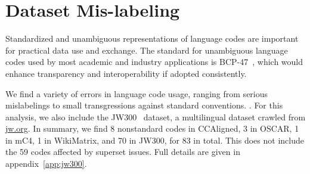 \section{Dataset Mis-labeling}
\label{sec:codes}


Standardized and unambiguous representations of language codes are important for practical data use and exchange. The standard for unambiguous language codes used by most academic and industry applications is BCP-47~\citep{phillips-etal-2005-tags}, which would  enhance transparency and interoperability if adopted consistently. %

We find a variety of errors in language code usage, ranging from serious mislabelings to small transgressions against standard conventions. . For this analysis, we also include the JW300~\citep{agic-vulic-2019-jw300} dataset, a multilingual dataset crawled from \url{jw.org}. %
In summary, we find 8 nonstandard codes in CCAligned, 3 in OSCAR, 1 in mC4, 1 in WikiMatrix, and 70 in JW300, for 83 in total. This does not include the 59 codes affected by superset issues. %
Full details are given in appendix~\ref{app:jw300}.


